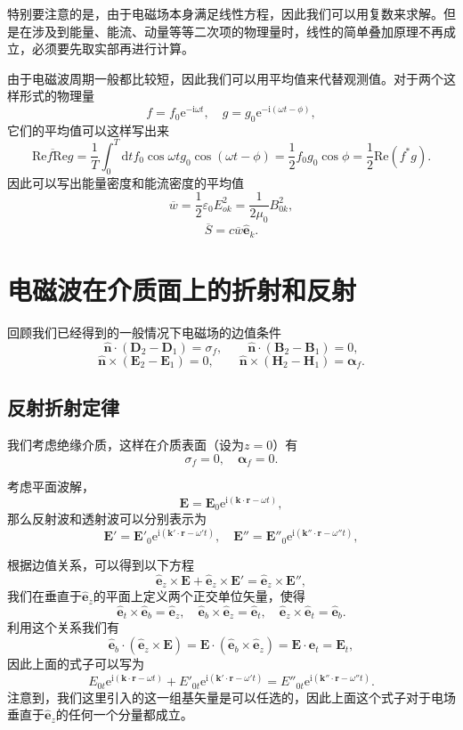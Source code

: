 \documentclass[UTF8]{ctexbook}
\newcommand{\e}{\mathrm{e}}
\renewcommand{\d}{\mathrm{d}}
\renewcommand{\b}{\boldsymbol}
\renewcommand{\i}{\mathrm{i}}
\renewcommand{\Re}{\mathrm{Re}}
\numberwithin{equation}{chapter}
\begin{document}
	特别要注意的是，由于电磁场本身满足线性方程，因此我们可以用复数来求解。但是在涉及到能量、能流、动量等等二次项的物理量时，线性的简单叠加原理不再成立，必须要先取实部再进行计算。
	
	由于电磁波周期一般都比较短，因此我们可以用平均值来代替观测值。对于两个这样形式的物理量
	\[f=f_0\e^{-\i\omega t},\quad g=g_0\e^{-\i(\omega t-\phi)},\]
	它们的平均值可以这样写出来
	\[\overline{\Re f\Re g}=\frac{1}{T}\int_0^T \d tf_0\cos\omega tg_0\cos(\omega t-\phi)=\frac{1}{2}f_0g_0\cos\phi=\frac{1}{2}\Re(f^*g).\]
	因此可以写出能量密度和能流密度的平均值
	\[\overline{w}=\frac{1}{2}\varepsilon_0E_{ok}^2=\frac{1}{2\mu_0}B_{0k}^2,\]
	\[\overline{S}=c\overline{w}\hat{\b{e}}_k.\]
	
	\section{电磁波在介质面上的折射和反射}
	回顾我们已经得到的一般情况下电磁场的边值条件
	\[\hat{\b{n}}\cdot(\b{D}_2-\b{D}_1)=\sigma_f,\qquad \hat{\b{n}}\cdot(\b{B}_2-\b{B}_1)=0,\]
	\[\hat{\b{n}}\times(\b{E}_2-\b{E}_1)=0,\qquad \hat{\b{n}}\times(\b{H}_2-\b{H}_1)=\b{\alpha}_f.\]
	
	\subsection{反射折射定律}
	我们考虑绝缘介质，这样在介质表面（设为$z=0$）有
	\[\sigma_f=0,\quad \b{\alpha}_f=0.\]
	\begin{figure}[H]
		\centering
	\end{figure}
	考虑平面波解，
	\[\b{E}=\b{E}_0\e^{\i(\b{k}\cdot\b{r}-\omega t)},\]
	那么反射波和透射波可以分别表示为
	\[\b{E}'=\b{E}'_0\e^{\i(\b{k}'\cdot\b{r}-\omega' t)},\quad \b{E}''=\b{E}''_0\e^{\i(\b{k}''\cdot\b{r}-\omega'' t)},\]

	根据边值关系，可以得到以下方程
	\[\hat{\b{e}}_z\times\b{E}+\hat{\b{e}}_z\times\b{E}'=\hat{\b{e}}_z\times\b{E}'',\]
	我们在垂直于$\hat{\b{e}}_z$的平面上定义两个正交单位矢量，使得
	\[\hat{\b{e}}_t\times\hat{\b{e}}_b=\hat{\b{e}}_z,\quad \hat{\b{e}}_b\times\hat{\b{e}}_z=\hat{\b{e}}_t,\quad \hat{\b{e}}_z\times\hat{\b{e}}_t=\hat{\b{e}}_b.\]
	利用这个关系我们有
	\[\hat{\b{e}}_b\cdot(\hat{\b{e}}_z\times\b{E})=\b{E}\cdot(\hat{\b{e}}_b\times\hat{\b{e}}_z)=\b{E}\cdot\b{e}_t=\b{E}_t,\]
	因此上面的式子可以写为
	\[E_{0t}\e^{\i(\b{k}\cdot\b{r}-\omega t)}+E'_{0t}\e^{\i(\b{k}'\cdot\b{r}-\omega' t)}=E''_{0t}\e^{\i(\b{k}''\cdot\b{r}-\omega'' t)}.\]
	注意到，我们这里引入的这一组基矢量是可以任选的，因此上面这个式子对于电场垂直于$\hat{\b{e}}_z$的任何一个分量都成立。
	
\end{document}
